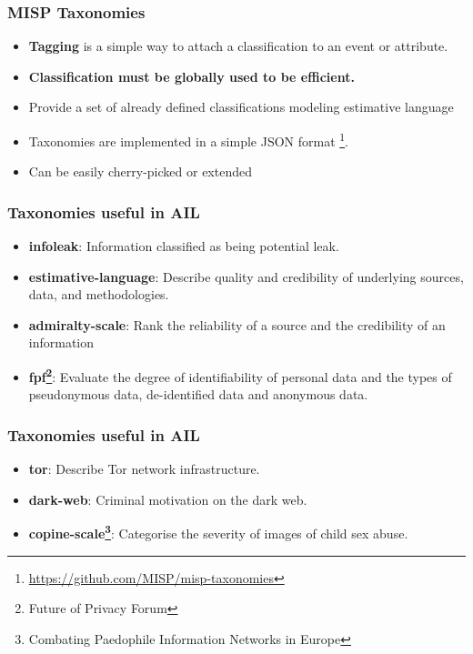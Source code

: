 \documentclass[aspectratio=169]{beamer}
\begin{document}
\begin{frame}
    \frametitle{MISP Taxonomies}
        \begin{itemize}
            \item {\bf Tagging} is a simple way to attach a classification to an event or attribute.
            \item {\bf Classification must be globally used to be efficient.}
            \item Provide a set of already defined classifications modeling estimative language
            \item Taxonomies are implemented in a simple JSON format \footnote{\url{https://github.com/MISP/misp-taxonomies}}.
            \item Can be easily cherry-picked or extended
        \end{itemize}
\end{frame}

\begin{frame}
    \frametitle{Taxonomies useful in AIL}
        \begin{itemize}
            \item {\bf infoleak}: Information classified as being potential leak.
            \item {\bf estimative-language}: Describe quality and credibility of underlying sources, data, and methodologies.
            \item {\bf admiralty-scale}: Rank the reliability of a source and the credibility of an information
            \item {\bf fpf\footnote{Future of Privacy Forum}}: Evaluate the degree of identifiability of personal data and the types of pseudonymous data, de-identified data and anonymous data.
        \end{itemize}
\end{frame}

\begin{frame}
    \frametitle{Taxonomies useful in AIL}
        \begin{itemize}
            \item {\bf tor}: Describe Tor network infrastructure.
            \item {\bf dark-web}: Criminal motivation on the dark web.
            \item {\bf copine-scale\footnote{Combating Paedophile Information Networks in Europe}}: Categorise the severity of images of child sex abuse.
        \end{itemize}
\end{frame}
\end{document}
